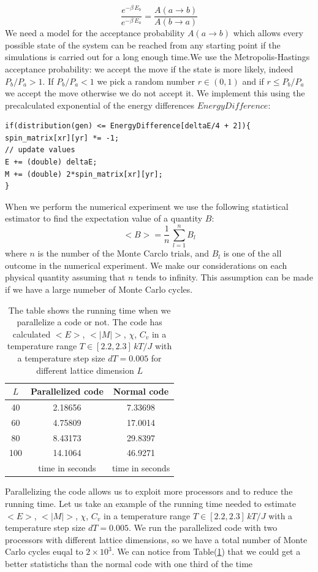 \documentclass[%
preprint,
 amsmath,amssymb,
 aps,
]{revtex4-1}
\theoremstyle{plain}
\theoremstyle{definition}
\theoremstyle{plain}
\begin{document}
\[
\frac{e^{-\beta \, E_b}}{e^{-\beta \, E_a}} = \frac{A(a\to b)}{A(b\to a)}
\]
We need a model for the acceptance probability $A(a \to b)$ which allows every possible state of the system can be reached from any starting point if the simulations is carried out for a long enough time.We use the Metropolis-Hastings acceptance probability: we accept the move if the state is more likely, indeed $P_b/P_a >1$. If $P_b/P_a <1$ we pick a random number $r \in (0,1)$ and if $r\le P_b/P_a$ we accept the move otherwise we do not accept it. We implement this using the precalculated exponential of the energy differences $EnergyDifference$:
\begin{lstlisting}
if(distribution(gen) <= EnergyDifference[deltaE/4 + 2]){
spin_matrix[xr][yr] *= -1;
// update values
E += (double) deltaE;
M += (double) 2*spin_matrix[xr][yr];
}
\end{lstlisting}
\par 
When we perform the numerical experiment we use the following statistical estimator to find the expectation value of a quantity $B$:
\begin{equation}
<B> = \frac{1}{n} \, \sum_{l=1} ^n B_l
\end{equation}
where $n$ is the number of the Monte Carclo trials, and $B_l$ is one of the all outcome in the numerical experiment.
We make our considerations on each physical quantity assuming that $n$ tends to infinity. This assumption can be made if we have a large numeber of Monte Carlo cycles.\\
\begin{table}[h!]
\centering
\setlength{\tabcolsep}{12pt}
\caption{The table shows the running time when we parallelize a code or not. The code has calculated $<E>$, $<|M|>$, $\chi$, $C_v$ in a temperature range $T\in[2.2,2.3] \, kT/J$ with a temperature step size $dT = 0.005$ for different lattice dimension $L$}
\label{time}
\begin{tabular}{ccc}
\toprule
$L$ &  Parallelized code & Normal code \\
\midrule
  40	    &   2.18656 & 7.33698 \\
  60	     &  4.75809 & 17.0014 \\
  80	     &  8.43173 & 29.8397 \\
  100	 &  14.1064 & 46.9271 \\
\bottomrule
 & time in seconds & time in seconds
\end{tabular}

\end{table}
Parallelizing the code allows us to exploit more processors and to reduce the running time. Let us take an example of the running time needed to estimate $<E>$, $<|M|>$, $\chi$, $C_v$ in a temperature range $T\in[2.2,2.3] \, kT/J$ with a temperature step size $dT = 0.005$. 
We run the parallelized code with two processors with different lattice dimensions, so we have a total number of Monte Carlo cycles euqal to $2 \times 10^3$. We can notice from Table(\ref{time}) that we could get a better statistichs than the normal code with one third of the time
\end{document}
